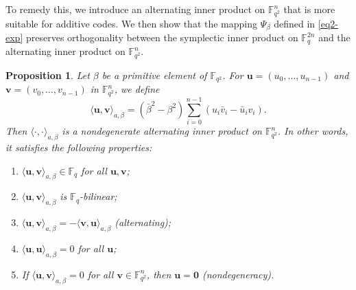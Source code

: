 \documentclass{aims}
\numberwithin{equation}{section}
\newtheorem{proposition}[theorem]{Proposition}
\theoremstyle{definition}
\newcommand{\F}{\mathbb{F}}
\begin{document}
To remedy this, we introduce an alternating inner product on $\F_{q^2}^n$ that is more suitable for additive codes. We then show that the mapping $\Psi_\beta$ defined in \eqref{eq2-exp} preserves orthogonality between the symplectic inner product on $\F_q^{2n}$ and the alternating inner product on $\F_{q^2}^n$. 



\begin{proposition}\label{prop:altinner}
	Let $\beta$ be a primitive element of $\F_{q^2}$. For $\pmb{u} = (u_0,\ldots,u_{n-1})$ and $\pmb{v} = (v_0,\ldots,v_{n-1})$ in $\F_{q^2}^n$, we define
	\begin{equation}\label{rrrrq123}
		\langle \pmb{u}, \pmb{v} \rangle_{a,\beta} = (\bar{\beta}^2 - \beta^2) \sum_{i=0}^{n-1} (u_i \bar{v}_i - \bar{u}_i v_i).
	\end{equation}
	Then $\langle \cdot,\cdot \rangle_{a,\beta}$ is a nondegenerate alternating inner product on $\F_{q^2}^n$. In other words, it satisfies the following properties:
	\begin{enumerate}
		\item $\langle \pmb{u}, \pmb{v} \rangle_{a,\beta} \in \F_q$ for all $\pmb{u},\pmb{v}$;
		\item $\langle \pmb{u}, \pmb{v} \rangle_{a,\beta}$ is $\F_q$-bilinear;
		\item $\langle \pmb{u}, \pmb{v} \rangle_{a,\beta} = -\langle \pmb{v}, \pmb{u} \rangle_{a,\beta}$ (alternating);
		\item $\langle \pmb{u}, \pmb{u} \rangle_{a,\beta} = 0$ for all $\pmb{u}$;
		\item If $\langle \pmb{u}, \pmb{v} \rangle_{a,\beta} = 0$ for all $\pmb{v} \in \F_{q^2}^n$, then $\pmb{u} = \mathbf{0}$ (nondegeneracy).
	\end{enumerate}
\end{proposition}
\end{document}
